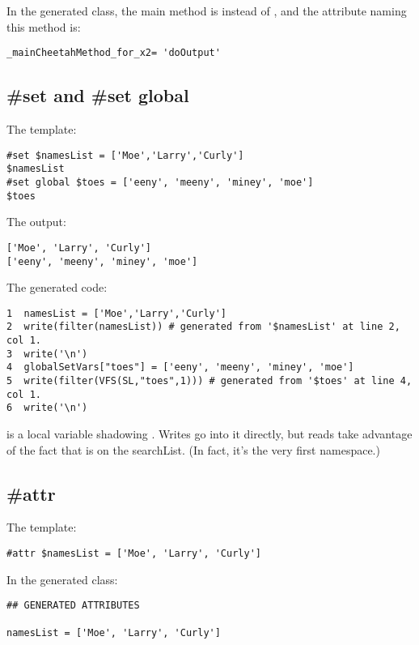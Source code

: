 In the generated class, the main method is  instead of
, and the attribute naming this method is:
\begin{verbatim}
_mainCheetahMethod_for_x2= 'doOutput'
\end{verbatim}


\subsection{\#set and \#set global}
\label{inheritanceEtc.set}

The template:
\begin{verbatim}
#set $namesList = ['Moe','Larry','Curly']
$namesList
#set global $toes = ['eeny', 'meeny', 'miney', 'moe']
$toes
\end{verbatim}

The output:
\begin{verbatim}
['Moe', 'Larry', 'Curly']
['eeny', 'meeny', 'miney', 'moe']
\end{verbatim}


The generated code:
\begin{verbatim}
1  namesList = ['Moe','Larry','Curly']
2  write(filter(namesList)) # generated from '$namesList' at line 2, col 1.
3  write('\n')
4  globalSetVars["toes"] = ['eeny', 'meeny', 'miney', 'moe']
5  write(filter(VFS(SL,"toes",1))) # generated from '$toes' at line 4, col 1.
6  write('\n')
\end{verbatim}

 is a local variable shadowing .
Writes go into it directly, but reads take advantage of the fact that
 is on the searchList.  (In fact, it's the very first
namespace.)


\subsection{\#attr}
\label{inheritanceEtc.attr}

The template:
\begin{verbatim}
#attr $namesList = ['Moe', 'Larry', 'Curly']
\end{verbatim}

In the generated class:
\begin{verbatim}
## GENERATED ATTRIBUTES

namesList = ['Moe', 'Larry', 'Curly']
\end{verbatim}


